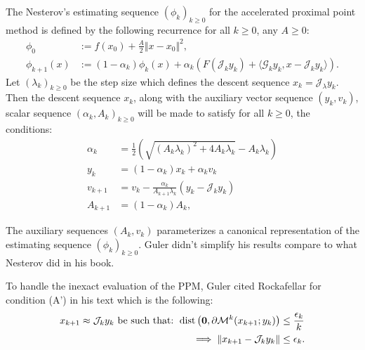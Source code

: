 \documentclass[12pt]{article}
\begin{document}
    \begin{definition}\label{def:nes-est-seq-acc-ppm}
        The Nesterov's estimating sequence $(\phi_k)_{k \ge0}$ for the accelerated proximal point method is defined by the following recurrence for all $k \ge0$, any $A \ge 0$: 
        \begin{align*}
            \phi_0 &:= f(x_0) + \frac{A}{2}\Vert x - x_0\Vert^2, 
            \\
            \phi_{k + 1}(x) &:= 
            (1 - \alpha_k)\phi_k(x)
            + 
            \alpha_k(F(\mathcal J_k y_k) + \langle \mathcal G_k y_k, x - \mathcal J_k y_k\rangle).    
        \end{align*}
        Let $(\lambda_k)_{k \ge 0}$ be the step size which defines the descent sequence $x_k = \mathcal J_\lambda y_k$. 
        Then the descent sequence $x_k$, along with the auxiliary vector sequence $(y_k, v_k)$, scalar sequence $(\alpha_k, A_k)_{k\ge 0}$ will be made to satisfy for all $k\ge0$, the conditions: 
        \begin{align*}
            \alpha_k &= \frac{1}{2}\left(
                \sqrt{(A_k\lambda_k)^2 + 4A_k \lambda_k}
                - A_k\lambda_k
            \right) 
            \\
            y_k &= (1 - \alpha_k)x_k + \alpha_k v_k
            \\
            v_{k + 1}
            &= 
            v_k - \frac{\alpha_k}{A_{k + 1}\lambda_k}(y_k - \mathcal J_k y_k)
            \\
            A_{k + 1} &= (1 - \alpha_k)A_k, 
        \end{align*}
    \end{definition}
    \begin{remark}
        The auxiliary sequences $(A_k, v_k)$ parameterizes a canonical representation of the estimating sequence $(\phi_k)_{k \ge0}$. 
        Guler didn't simplify his results compare to what Nesterov did in his book. 
    \end{remark}
    To handle the inexact evaluation of the PPM, Guler cited Rockafellar \cite{rockafellar_monotone_1976} for condition (A') in his text which is the following: 
    \begin{align*}
        x_{k + 1}\approx \mathcal J_{k} y_k \text{ be such that: }
        \operatorname{dist}\left(
            \mathbf 0, \partial \mathcal M^{k}(x_{k + 1}; y_k)
        \right) &\le \frac{\epsilon_k}{k}
        \\
        \implies 
        \Vert x_{k + 1} - \mathcal J_{k}y_k\Vert 
        &\le \epsilon_k. 
    \end{align*}
\end{document}
